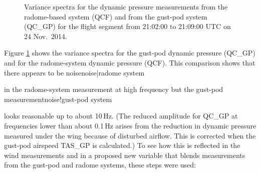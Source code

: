 \documentclass[12pt,twoside,english]{article}\usepackage[]{graphicx}\usepackage[]{color}
\let\OrgIndex\index
\renewcommand*{\index}[1]{\OrgIndex{#1}}
\begin{document}
{{\begin{figure}
\protect\protect\protect\caption{\label{fig:AppxB-PSD1314}Variance spectra for the dynamic pressure measurements from the radome-based system (QCF) and from the gust-pod system (QC\_GP) for the flight segment from 21:02:00 to 21:09:00 UTC on 24 Nov.\ 2014.} 
\end{figure}

Figure \ref{fig:AppxB-PSD1314} shows the variance spectra for the gust-pod dynamic pressure (QC\_GP) and for the radome-system dynamic pressure (QCF). This comparison shows that there appears to be noise\index[noise|radome system} in the radome-system measurement at high frequency but the gust-pod measurement\index[noise!gust-pod system} looks reasonable up to about 10\,Hz. (The reduced amplitude for QC\_GP at frequencies lower than about 0.1\,Hz arises from the reduction in dynamic pressure measured under the wing because of disturbed airflow. This is corrected when the gust-pod airspeed TAS\_GP is calculated.) To see how this is reflected in the wind measurements and in a proposed new variable that blends measurements from the gust-pod and radome systems, these steps were used: 
\end{document}
